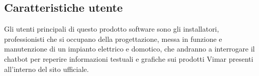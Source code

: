 \subsection{Caratteristiche utente}
Gli utenti principali di questo prodotto software sono gli installatori, professionisti che si occupano della progettazione, messa in funzione e manutenzione di un impianto elettrico e domotico, che andranno a interrogare il chatbot per reperire informazioni testuali e grafiche sui prodotti Vimar presenti all'interno del sito ufficiale. 